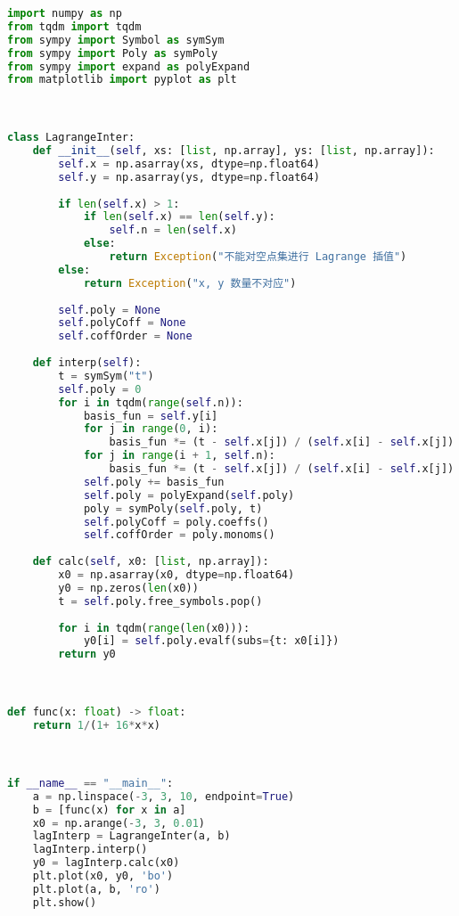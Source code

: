 \begin{lstlisting}[language=python]
import numpy as np
from tqdm import tqdm
from sympy import Symbol as symSym
from sympy import Poly as symPoly
from sympy import expand as polyExpand
from matplotlib import pyplot as plt



class LagrangeInter:
    def __init__(self, xs: [list, np.array], ys: [list, np.array]):
        self.x = np.asarray(xs, dtype=np.float64)
        self.y = np.asarray(ys, dtype=np.float64)
        
        if len(self.x) > 1:
            if len(self.x) == len(self.y):
                self.n = len(self.x)
            else:
                return Exception("不能对空点集进行 Lagrange 插值")
        else:
            return Exception("x, y 数量不对应")
        
        self.poly = None
        self.polyCoff = None
        self.coffOrder = None
    
    def interp(self):
        t = symSym("t")
        self.poly = 0
        for i in tqdm(range(self.n)):
            basis_fun = self.y[i]
            for j in range(0, i):
                basis_fun *= (t - self.x[j]) / (self.x[i] - self.x[j])
            for j in range(i + 1, self.n):
                basis_fun *= (t - self.x[j]) / (self.x[i] - self.x[j])
            self.poly += basis_fun
            self.poly = polyExpand(self.poly)
            poly = symPoly(self.poly, t)
            self.polyCoff = poly.coeffs()
            self.coffOrder = poly.monoms()
    
    def calc(self, x0: [list, np.array]):
        x0 = np.asarray(x0, dtype=np.float64)
        y0 = np.zeros(len(x0))
        t = self.poly.free_symbols.pop()
        
        for i in tqdm(range(len(x0))):
            y0[i] = self.poly.evalf(subs={t: x0[i]})
        return y0



def func(x: float) -> float:
    return 1/(1+ 16*x*x)



if __name__ == "__main__":
    a = np.linspace(-3, 3, 10, endpoint=True)
    b = [func(x) for x in a]
    x0 = np.arange(-3, 3, 0.01)
    lagInterp = LagrangeInter(a, b)
    lagInterp.interp()
    y0 = lagInterp.calc(x0)
    plt.plot(x0, y0, 'bo')
    plt.plot(a, b, 'ro')
    plt.show()
\end{lstlisting}